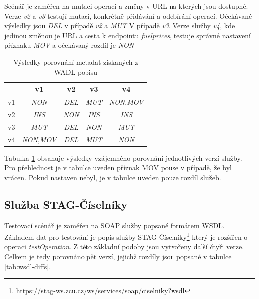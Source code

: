 \documentclass[czech,DP]{thesiskiv}
\begin{document}
Scénář je zaměřen na mutaci operací a změny v URL na kterých jsou dostupné. Verze \textit{v2} a \textit{v3} testují mutaci, konkrétně přidávání a odebírání operací. Očekávané výsledky jsou \textit{DEL} v případě \textit{v2} a \textit{MUT} V případě \textit{v3}. Verze služby \textit{v4}, kde jedinou změnou je URL a cesta k endpointu \textit{fuelprices}, testuje správné nastavení příznaku \textit{MOV} a očekávaný rozdíl je \textit{NON}

\begin{table}[h]
	\centering
	\begin{tabular}{|l||c|c|c|c|}
		\hline
		& v1 & v2 & v3 & v4 \\
		\hline
		\hline
		v1 & \textit{NON} & \textit{DEL} & \textit{MUT} & \textit{NON},\textit{MOV} \\
		\hline
		v2 & \textit{INS} & \textit{NON} & \textit{INS} & \textit{INS} \\
		\hline
		v3 & \textit{MUT} & \textit{DEL} & \textit{NON} & \textit{MUT} \\
		\hline
		v4 & \textit{NON},\textit{MOV} & \textit{DEL} & \textit{MUT} & \textit{NON} \\
		\hline
	\end{tabular}
	\caption{Výsledky porovnání metadat získaných z WADL popisu}
	\label{tab:wadl-cmp-res}
\end{table} 

Tabulka \ref{tab:wadl-cmp-res} obsahuje výsledky vzájemného porovnání jednotlivých verzí služby. Pro přehlednost je v tabulce uveden příznak MOV pouze v případě, že byl vrácen. Pokud nastaven nebyl, je v tabulce uveden pouze rozdíl služeb. 

\subsection{Služba STAG-Číselníky}

Testovací scénář je zaměřen na SOAP služby popsané formátem WSDL. Základem dat pro testování je popis služby STAG-Číselníky\footnote{https://stag-ws.zcu.cz/ws/services/soap/ciselniky?wsdl} který je rozšířen o operaci \textit{testOperation}. Z této základní podoby jsou vytvořeny další čtyři verze. Celkem je tedy porovnáno pět verzí, jejichž rozdíly jsou popsané v tabulce \ref{tab:wsdl-diffs}.
\end{document}
